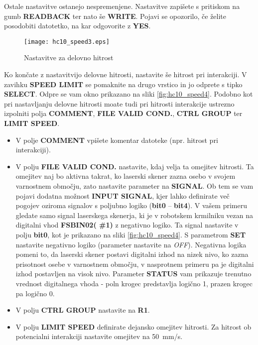 Ostale nastavitve ostanejo nespremenjene. Nastavitve zapišete s pritiskom na gumb \textbf{READBACK} ter nato še \textbf{WRITE}. Pojavi se opozorilo, če želite posodobiti datotetko, na kar odgovorite z \textbf{YES}.

\begin{figure}[!hbt]
	\centering
	\texttt{[image: hc10\_speed3.eps]}
	\caption{Nastavitve za delovno hitrost}
	\label{fig:hc10_speed3}
\end{figure}

Ko končate z nastavitvijo delovne hitrosti, nastavite še hitrost pri interakciji. V zavihku \textbf{SPEED LIMIT} se pomaknite na drugo vrstico in jo odprete s tipko \textbf{SELECT}. Odpre se vam okno prikazano na sliki \ref{fig:hc10_speed4}. Podobno kot pri nastavljanju delovne hitrosti moate tudi pri hitrosti interakcije ustrezno izpolniti polja \textbf{COMMENT}, \textbf{FILE VALID COND.}, \textbf{CTRL GROUP} ter \textbf{LIMIT SPEED}.

\begin{itemize}
	\item V polje \textbf{COMMENT} vpišete komentar datoteke (npr. hitrost pri interakciji).
	\item V polju \textbf{FILE VALID COND.} nastavite, kdaj velja ta omejitev hitrosti. Ta  omejitev naj bo aktivna takrat, ko laserski skener zazna osebo v svojem varnostnem območju, zato nastavite parameter na \textbf{SIGNAL}. Ob tem se vam pojavi dodatna možnost \textbf{INPUT SIGNAL}, kjer lahko definirate več pogojev oziroma signalov s poljubno logiko (\textbf{bit0} -- \textbf{bit4}). V vašem primeru gledate samo signal laserskega skenerja, ki je v robotskem krmilniku vezan na digitalni vhod  \textbf{FSBIN02( \#1)} z negativno logiko. Ta signal nastavite v polju \textbf{bit0}, kot je prikazano na sliki \ref{fig:hc10_speed4}. S parametrom \textbf{SET} nastavite negativno logiko (parameter nastavite na \emph{OFF}). Negativna logika pomeni to, da laserski skener postavi digitalni izhod na nizek nivo, ko zazna prisotnost osebe v varnostnem območju, v nasprotnem primeru pa je digitalni izhod postavljen na visok nivo. Parameter \textbf{STATUS} vam prikazuje trenutno vrednost digitalnega vhoda - poln krogec predstavlja logično 1, prazen krogec pa logično 0.
	\item V polju \textbf{CTRL GROUP} nastavite na \textbf{R1}.
	\item V polju \textbf{LIMIT SPEED} definirate dejansko omejitev hitrosti. Za hitrost ob potencialni interakciji nastavite omejitev na 50~mm/s.
\end{itemize}

